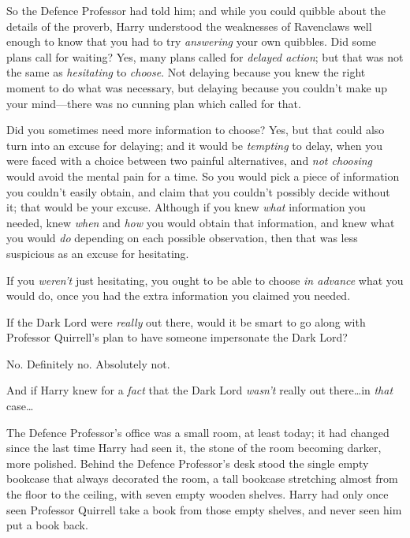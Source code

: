 
 

\hplettrineextrapara
So the Defence Professor had told him; and while you could quibble about the details of the proverb, Harry understood the weaknesses of Ravenclaws well enough to know that you had to try \emph{answering} your own quibbles. Did some plans call for waiting? Yes, many plans called for \emph{delayed action}; but that was not the same as \emph{hesitating} to \emph{choose}. Not delaying because you knew the right moment to do what was necessary, but delaying because you couldn't make up your mind—there was no cunning plan which called for that.

Did you sometimes need more information to choose? Yes, but that could also turn into an excuse for delaying; and it would be \emph{tempting} to delay, when you were faced with a choice between two painful alternatives, and \emph{not choosing} would avoid the mental pain for a time. So you would pick a piece of information you couldn't easily obtain, and claim that you couldn't possibly decide without it; that would be your excuse. Although if you knew \emph{what} information you needed, knew \emph{when} and \emph{how} you would obtain that information, and knew what you would \emph{do} depending on each possible observation, then that was less suspicious as an excuse for hesitating.

If you \emph{weren't} just hesitating, you ought to be able to choose \emph{in advance} what you would do, once you had the extra information you claimed you needed.

If the Dark Lord were \emph{really} out there, would it be smart to go along with Professor Quirrell's plan to have someone impersonate the Dark Lord?

No. Definitely no. Absolutely not.

And if Harry knew for a \emph{fact} that the Dark Lord \emph{wasn't} really out there…in \emph{that} case…

The Defence Professor's office was a small room, at least today; it had changed since the last time Harry had seen it, the stone of the room becoming darker, more polished. Behind the Defence Professor's desk stood the single empty bookcase that always decorated the room, a tall bookcase stretching almost from the floor to the ceiling, with seven empty wooden shelves. Harry had only once seen Professor Quirrell take a book from those empty shelves, and never seen him put a book back.

